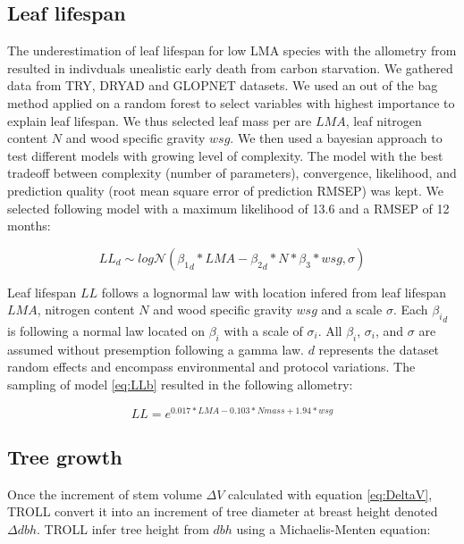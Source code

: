 \documentclass[12pt,]{article}
\theoremstyle{definition}
\theoremstyle{definition}
\theoremstyle{remark}
\begin{document}
\subsection{Leaf lifespan}\label{leaf-lifespan-1}

The underestimation of leaf lifespan for low LMA species with the
allometry from \citet{Reich1991a} resulted in indivduals unealistic
early death from carbon starvation. We gathered data from
TRY\citep{Kattge2011}, DRYAD \citep{chave_towards_2009} and GLOPNET
\citep{wright_worldwide_2004} datasets. We used an out of the bag method
applied on a random forest to select variables with highest importance
to explain leaf lifespan. We thus selected leaf mass per are \(LMA\),
leaf nitrogen content \(N\) and wood specific gravity \(wsg\). We then
used a bayesian approach to test different models with growing level of
complexity. The model with the best tradeoff between complexity (number
of parameters), convergence, likelihood, and prediction quality (root
mean square error of prediction RMSEP) was kept. We selected following
model with a maximum likelihood of 13.6 and a RMSEP of 12 months:

\begin{equation}
  LL_{d} \sim log\mathcal{N}({\beta_1}_d*LMA - {\beta_2}_d*N*\beta_3*wsg, \sigma)
  \label{eq:LLb}
\end{equation}

Leaf lifespan \(LL\) follows a lognormal law with location infered from
leaf lifespan \(LMA\), nitrogen content \(N\) and wood specific gravity
\(wsg\) and a scale \(\sigma\). Each \({\beta_i}_d\) is following a
normal law located on \(\beta_i\) with a scale of \(\sigma_i\). All
\(\beta_i\), \(\sigma_i\), and \(\sigma\) are assumed without
presemption following a gamma law. \(d\) represents the dataset random
effects and encompass environmental and protocol variations. The
sampling of model \eqref{eq:LLb} resulted in the following allometry:

\begin{equation}
  LL = e^{0.017*LMA - 0.103*Nmass + 1.94*wsg}
  \label{eq:LL}
\end{equation}

\subsection{Tree growth}\label{tree-growth}

Once the increment of stem volume \(\Delta V\) calculated with equation
\eqref{eq:DeltaV}, TROLL convert it into an increment of tree diameter at
breast height denoted \(\Delta dbh\). TROLL infer tree height from
\(dbh\) using a Michaelis-Menten equation:
\end{document}
